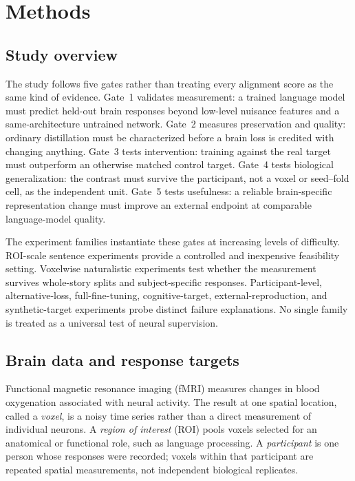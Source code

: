 \section{Methods}
\label{sec:methods}

\subsection{Study overview}

The study follows five gates rather than treating every alignment score as the same kind of evidence.
Gate~1 validates measurement: a trained language model must predict held-out brain responses beyond low-level nuisance features and a same-architecture untrained network.
Gate~2 measures preservation and quality: ordinary distillation must be characterized before a brain loss is credited with changing anything.
Gate~3 tests intervention: training against the real target must outperform an otherwise matched control target.
Gate~4 tests biological generalization: the contrast must survive the participant, not a voxel or seed--fold cell, as the independent unit.
Gate~5 tests usefulness: a reliable brain-specific representation change must improve an external endpoint at comparable language-model quality.

The experiment families instantiate these gates at increasing levels of difficulty.
ROI-scale sentence experiments provide a controlled and inexpensive feasibility setting.
Voxelwise naturalistic experiments test whether the measurement survives whole-story splits and subject-specific responses.
Participant-level, alternative-loss, full-fine-tuning, cognitive-target, external-reproduction, and synthetic-target experiments probe distinct failure explanations.
No single family is treated as a universal test of neural supervision.

\subsection{Brain data and response targets}

Functional magnetic resonance imaging (fMRI) measures changes in blood oxygenation associated with neural activity.
The result at one spatial location, called a \emph{voxel}, is a noisy time series rather than a direct measurement of individual neurons.
A \emph{region of interest} (ROI) pools voxels selected for an anatomical or functional role, such as language processing.
A \emph{participant} is one person whose responses were recorded; voxels within that participant are repeated spatial measurements, not independent biological replicates.

